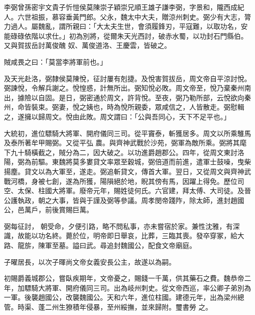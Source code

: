 
\begin{pinyinscope}

 李弼曾孫密宇文貴子忻愷侯莫陳崇子穎崇兄順王雄子謙李弼，字景和，隴西成紀人。六世祖振，慕容垂黃門郎。父永，魏太中大夫，贈涼州刺史。弼少有大志，膂力過人。屬魏亂，謂所親曰：「大太夫生世，會須履鋒刃，平寇難，以取功名，安能碌碌依階以求仕。」初為別將，從爾朱天光西討，破赤水蜀，以功封石門縣伯。又與賀拔岳討萬俊醜
 奴、萬俊道洛、王慶雲，皆破之。



 賊咸畏之曰：「莫當李將軍前也。」



 及天光赴洛，弼隸侯莫陳悅，征討屢有剋捷。及悅害賀拔岳，周文帝自平涼討悅。弼諫悅，令解兵謝之。悅惶惑，計無所出。弼知悅必敗。周文帝至，悅乃棄秦州南出，據險以自固。是日，弼密通於周文，許背悅。至夜，弼乃勒所部，云悅欲向秦州，命皆裝束。弼妻，悅之姨也，時為悅所親委，眾咸信之，人皆散走。弼慰輯之，遂擁以歸周文。悅由此敗。周文謂曰：「公與吾同心，天下不足平也。」



 大統初，進位驃騎大將軍、開府儀同三司。從平竇泰，斬獲居多。周文以所乘騅馬及泰所著牟甲賜弼。又從平弘
 農。與齊神武戰於沙苑，弼軍為敵所乘。弼將其麾下九十騎橫截之，賊分為二，因大破之。以功進爵趙郡公。四年，從周文東討洛陽，弼為前驅。東魏將莫多婁貸文率眾至穀城，弼倍道而前進，遣軍士鼓噪，曳柴揚塵。貸文以為大軍至，遂走。弼追斬貸文，傳首大軍。翌日，又從周文與齊神武戰河橋，身被七創，遂為所獲，陽隕絕於地，睨其傍有馬，因躍上得免。歷位司空、太保、柱國大將軍。廢帝元年，賜姓徒何氏。六官建，拜太傅、大司徒。及晉公護執政，朝之大事，皆與于謹及弼等參議。周孝閔帝踐阼，除太師，進封趙國公，邑萬戶，前後賞賜巨萬。



 弼每征討，
 朝受命，夕便引路，略不問私事，亦未嘗宿於家。兼性沈雅，有深識，故能以功名終。薨於位，明帝即日舉哀，比葬，三臨其喪。發卒穿冢，給大路、龍旂，陳軍至墓。謚曰武。尋追封魏國公，配食文帝廟庭。



 子曜居長，以次子暉尚文帝女義安長公主，故遂以為嗣。



 初賜爵義城郡公，嘗臥疾期年，文帝憂之，賜錢一千萬，供其藥石之費。魏恭帝二年，加驃騎大將軍、開府儀同三司。出為岐州刺史。從文帝西巡，率公卿子弟別為一軍。後襲趙國公，改襲魏國公。天和六年，進位柱國。建德元年，出為梁州總管。時渠、蓬二州生獠積年侵暴，至州綏撫，並來歸附。璽書勞
 之。




\end{pinyinscope}

